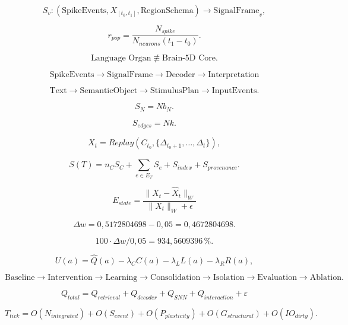 \[
S_{v}:\left( \text{SpikeEvents},X_{\left\lbrack t_{0},t_{1} \right\rbrack},\text{RegionSchema} \right) \rightarrow \text{SignalFrame}_{v},
\]

\[
r_{pop} = \frac{N_{spike}}{N_{neurons}\left( t_{1} - t_{0} \right)}.
\]

\[
\text{Language Organ} ≢ \text{Brain-5D Core}.
\]

\[
\text{SpikeEvents} \rightarrow \text{SignalFrame} \rightarrow \text{Decoder} \rightarrow \text{Interpretation}
\]

\[
\text{Text} \rightarrow \text{SemanticObject} \rightarrow \text{StimulusPlan} \rightarrow \text{InputEvents}.
\]

\[
S_{N} = Nb_{N}.
\]

\[
S_{edges} = Nk.
\]

\[
X_{t} = Replay\left( C_{t_{0}},\{\Delta_{t_{0} + 1},\ldots,\Delta_{t}\} \right),
\]

\[
S(T) = n_{C}S_{C} + \sum_{e \in E_{T}}^{}S_{e} + S_{index} + S_{provenance}.
\]

\[
E_{state} = \frac{\parallel X_{t} - {\hat{X}}_{t} \parallel_{W}}{\parallel X_{t} \parallel_{W} + \epsilon}
\]

\[
\Delta w=0{,}5172804698-0{,}05=0{,}4672804698.
\]

\[
100\cdot\Delta w/0{,}05=934{,}5609396\,\%.
\]

\[
U(a)=\widehat{Q}(a)-\lambda_C C(a)-\lambda_L L(a)-\lambda_R R(a),
\]

\[
\text{Baseline} \rightarrow \text{Intervention} \rightarrow \text{Learning} \rightarrow \text{Consolidation} \rightarrow \text{Isolation} \rightarrow \text{Evaluation} \rightarrow \text{Ablation}.
\]

\[
Q_{total} = Q_{retrieval} + Q_{decoder} + Q_{SNN} + Q_{interaction} + \varepsilon
\]

\[
T_{tick} = O\left( N_{integrated} \right) + O\left( S_{event} \right) + O\left( P_{plasticity} \right) + O\left( G_{structural} \right) + O\left( IO_{dirty} \right).
\]

